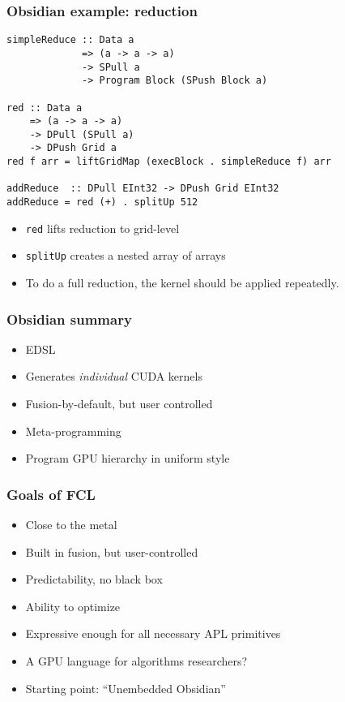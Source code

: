 \documentclass{beamer}
\begin{document}
\begin{frame}[fragile]
  \frametitle{Obsidian example: reduction}

\begin{verbatim}
simpleReduce :: Data a 
             => (a -> a -> a)
             -> SPull a
             -> Program Block (SPush Block a)

red :: Data a
    => (a -> a -> a)
    -> DPull (SPull a)
    -> DPush Grid a
red f arr = liftGridMap (execBlock . simpleReduce f) arr

addReduce  :: DPull EInt32 -> DPush Grid EInt32
addReduce = red (+) . splitUp 512
\end{verbatim}
\pause
\begin{itemize}
\item \texttt{red} lifts reduction to grid-level
\item \texttt{splitUp} creates a nested array of arrays
\item To do a full reduction, the kernel should be applied repeatedly.
\end{itemize}
\end{frame}

\begin{frame}[fragile]
  \frametitle{Obsidian summary}

\begin{itemize}
\item EDSL
\item Generates \textit{individual} CUDA kernels
\item Fusion-by-default, but user controlled
\item Meta-programming
\item Program GPU hierarchy in uniform style
\end{itemize}
\end{frame}



\begin{frame}
\frametitle{Goals of FCL}
\begin{itemize}
\item Close to the metal
\item Built in fusion, but user-controlled
\item Predictability, no black box
\item Ability to optimize
\item Expressive enough for all necessary APL primitives
\item A GPU language for algorithms researchers?
\item Starting point: ``Unembedded Obsidian''
\end{itemize}
\end{frame}
\end{document}
